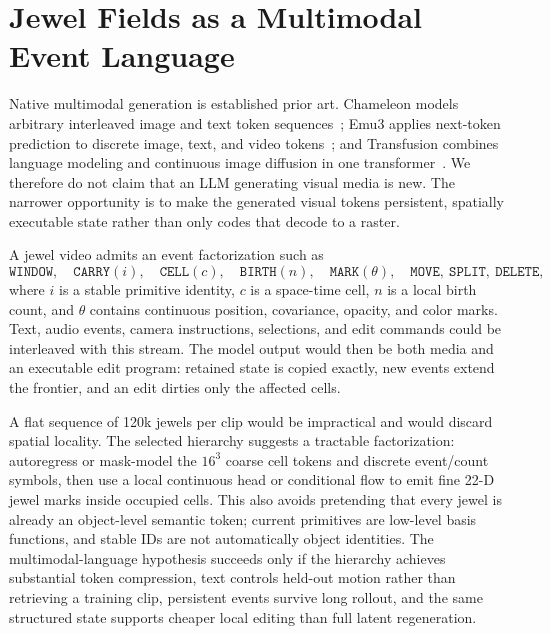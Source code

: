 \documentclass[10pt]{article}
\begin{document}
\section{Jewel Fields as a Multimodal Event Language}

Native multimodal generation is established prior art. Chameleon models arbitrary interleaved
image and text token sequences~\cite{chameleon2024}; Emu3 applies next-token prediction to discrete
image, text, and video tokens~\cite{wang2024emu3}; and Transfusion combines language modeling and
continuous image diffusion in one transformer~\cite{zhou2025transfusion}. We therefore do not claim
that an LLM generating visual media is new. The narrower opportunity is to make the generated visual
tokens persistent, spatially executable state rather than only codes that decode to a raster.

A jewel video admits an event factorization such as
\begin{equation}
\texttt{WINDOW},\quad \texttt{CARRY}(i),\quad \texttt{CELL}(c),\quad
\texttt{BIRTH}(n),\quad \texttt{MARK}(\theta),\quad
\texttt{MOVE},\ \texttt{SPLIT},\ \texttt{DELETE},
\end{equation}
where $i$ is a stable primitive identity, $c$ is a space-time cell, $n$ is a local birth count, and
$\theta$ contains continuous position, covariance, opacity, and color marks. Text, audio events,
camera instructions, selections, and edit commands could be interleaved with this stream. The model
output would then be both media and an executable edit program: retained state is copied exactly,
new events extend the frontier, and an edit dirties only the affected cells.

A flat sequence of 120k jewels per clip would be impractical and would discard spatial locality.
The selected hierarchy suggests a tractable factorization: autoregress or mask-model the
$16^3$ coarse cell tokens and discrete event/count symbols, then use a local continuous head or
conditional flow to emit fine 22-D jewel marks inside occupied cells. This also avoids pretending
that every jewel is already an object-level semantic token; current primitives are low-level basis
functions, and stable IDs are not automatically object identities. The multimodal-language
hypothesis succeeds only if the hierarchy achieves substantial token compression, text controls
held-out motion rather than retrieving a training clip, persistent events survive long rollout, and
the same structured state supports cheaper local editing than full latent regeneration.
\end{document}
